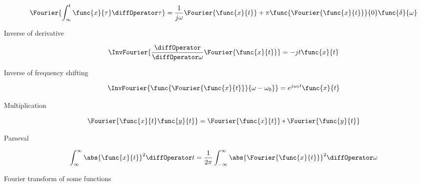 \begin{description}
    \begin{equation*}
        \Fourier{\int_{\infty}^t \func{x}{\tau} \diffOperator \tau} = \dfrac{1}{j\omega} \Fourier{\func{x}{t}} + \pi \func{\Fourier{\func{x}{t}}}{0} \func{\delta}{\omega} 
    \end{equation*}
    \item[Inverse of derivative]
    \begin{equation*}
        \InvFourier{\dfrac{\diffOperator}{\diffOperator \omega} \Fourier{\func{x}{t}}} =-jt \func{x}{t}
    \end{equation*}
    \item[Inverse of frequency shifting]
    \begin{equation*}
        \InvFourier{\func{\Fourier{\func{x}{t}}}{\omega - \omega_0}} = e^{j\omega_0 t} \func{x}{t}
    \end{equation*}
    \item[Multiplication]
    \begin{equation*}
        \Fourier{\func{x}{t} \func{y}{t}} = \Fourier{\func{x}{t}} \ast \Fourier{\func{y}{t}}
    \end{equation*}
    \item[Parseval]
    \begin{equation*}
        \int_{\infty}^{\infty} \abs{\func{x}{t}}^2 \diffOperator t = \dfrac{1}{2\pi} \int_{-\infty}^{\infty} \abs{\Fourier{\func{x}{t}}}^2 \diffOperator \omega 
    \end{equation*}
\end{description}
Fourier transform of some functions 

